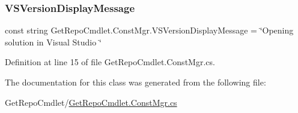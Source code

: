 \mbox{\label{class_get_repo_cmdlet_1_1_const_mgr_a31dd1e15462f9167c235c530003d6720}} 
\subsubsection{\texorpdfstring{V\+S\+Version\+Display\+Message}{VSVersionDisplayMessage}}
{\footnotesize\ttfamily const string Get\+Repo\+Cmdlet.\+Const\+Mgr.\+V\+S\+Version\+Display\+Message = \char`\"{}Opening solution in Visual Studio \char`\"{}\hspace{0.3cm}{\ttfamily [package]}}



Definition at line 15 of file Get\+Repo\+Cmdlet.\+Const\+Mgr.\+cs.



The documentation for this class was generated from the following file\+:\begin{DoxyCompactItemize}
\item 
Get\+Repo\+Cmdlet/\mbox{\hyperlink{_get_repo_cmdlet_8_const_mgr_8cs}{Get\+Repo\+Cmdlet.\+Const\+Mgr.\+cs}}\end{DoxyCompactItemize}
